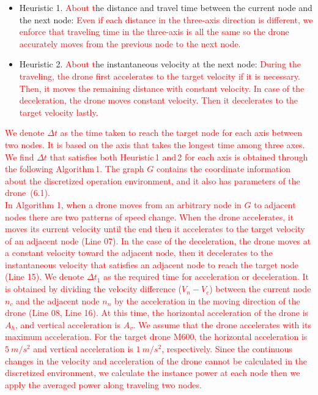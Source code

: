 \documentclass[onecolumn]{IEEEconf}
\begin{document}
\begin{description}
\begin{mdframed} [ linewidth=.75pt, userdefinedwidth=0.9\textwidth]
\begin{itemize}
    \item Heuristic 1. \textcolor{red}{About t}he distance and travel time between the current node and the next node: \textcolor{red}{Even if each distance in the three-axis direction is different, we enforce that traveling time in the three-axis is all the same so the drone accurately moves from the previous node to the next node.}
    \item Heuristic 2. \textcolor{red}{About t}he instantaneous velocity at the next node: \textcolor{red}{During the traveling, the drone first accelerates to the target velocity if it is necessary. Then, it moves the remaining distance with constant velocity. In case of the deceleration, the drone moves constant velocity. Then it decelerates to the target velocity lastly.}
    \end{itemize}
    \textcolor{red}{We denote $\Delta t$ as the time taken to reach the target node for each axis between two nodes. It is based on the axis that takes the longest time among three axes. We find $\Delta t$ that satisfies both Heuristic\,1 and\,2 for each axis is obtained through the following Algorithm\,1. 
    The graph $G$ contains the coordinate information about the discretized operation environment, and it also has parameters of the drone~(6.1).}~\\
    \textcolor{red}{In Algorithm 1, when a drone moves from an arbitrary node in $G$ to adjacent nodes there are two patterns of speed change. When the drone accelerates, it moves its current velocity until the end then it accelerates to the target velocity of an adjacent node (Line 07). 
    In the case of the deceleration, the drone moves at a constant velocity toward the adjacent node, then it decelerates to the instantaneous velocity that satisfies an adjacent node to reach the target node (Line 15).
    We denote $\Delta t_1$ as the required time for acceleration or deceleration. It is obtained by dividing the velocity difference ($V_n - V_c$) between the current node $n_c$ and the adjacent node $n_n$ by the acceleration in the moving direction of the drone (Line 08, Line 16).
    At this time, the horizontal acceleration of the drone is $A_h$, and vertical acceleration is $A_v$. We assume that the drone accelerates with its maximum acceleration. For the target drone M600, the horizontal acceleration is $5~m/s^2$ and vertical acceleration is $1~m/s^2$, respectively.
    Since the continuous changes in the velocity and acceleration of the drone cannot be calculated in the discretized environment, we calculate the instance power at each node then we apply the averaged power along traveling two nodes.
}
\end{mdframed}
\end{description}
\end{document}

